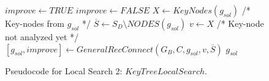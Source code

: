 \documentclass{llncs}
\begin{document}
\begin{figure}[H]
\begin{algorithm}[H]
\caption{$g_{sol} = KeyTreeLocalSearch(G_B,C,g_{sol})$}
\begin{algorithmic}[1]
\STATE $improve \leftarrow TRUE$
\STATE $improve \leftarrow FALSE$
\STATE $ X \leftarrow KeyNodes(g_{sol})$ /* Key-nodes from $g_{sol}$ */
\STATE $\overline{S} \leftarrow S_D \setminus NODES(g_{sol})$
\STATE $v \leftarrow X$ /* Key-node not analyzed yet */
\STATE $[g_{sol},improve] \leftarrow GeneralRecConnect(G_B,C,g_{sol},v,\overline{S})$
\ENDWHILE
\ENDWHILE
\RETURN $g_{sol}$
\end{algorithmic}
\end{algorithm}
\caption{Pseudocode for Local Search 2: $KeyTreeLocalSearch$.\label{alg-ktls}}
\end{figure}



\end{document}
